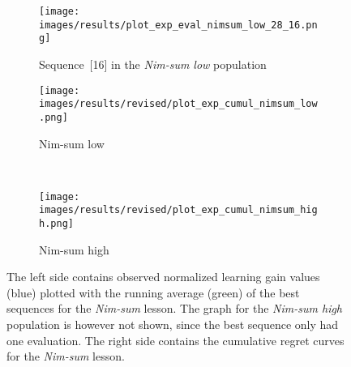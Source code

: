 \begin{figure}[ht]
	\centering
	\begin{subfigure}{0.6\linewidth}
	\centering
	\texttt{[image: images/results/plot\_exp\_eval\_nimsum\_low\_28\_16.png]}
	\caption{Sequence~[16] in the \emph{Nim-sum low} population}
	\label{fig:exp_eval_nimsum_low_28}
	\end{subfigure}
	\hfill
	\begin{subfigure}{0.39\linewidth}
	\centering
	\texttt{[image: images/results/revised/plot\_exp\_cumul\_nimsum\_low.png]}
	\caption{Nim-sum low}
	\label{fig:exp_cumul_nimsum_low}
	\end{subfigure}\\
	\hfill
	\begin{subfigure}{0.39\linewidth}
	\centering
	\texttt{[image: images/results/revised/plot\_exp\_cumul\_nimsum\_high.png]}
	\caption{Nim-sum high}
	\label{fig:exp_cumul_nimsum_high}
	\end{subfigure}
	\caption[Evaluations of best sequences and cumulative regret in
	Nim-sum]{The left side contains observed normalized learning gain values
		(blue) plotted with the running average (green) of the best sequences
		for the \emph{Nim-sum} lesson. The graph for the \emph{Nim-sum high}
		population is however not shown, since the best sequence only had one
		evaluation. The right side contains the cumulative
		regret curves for the \emph{Nim-sum} lesson.}
	\label{fig:exp_eval_nimsum}
\end{figure}

